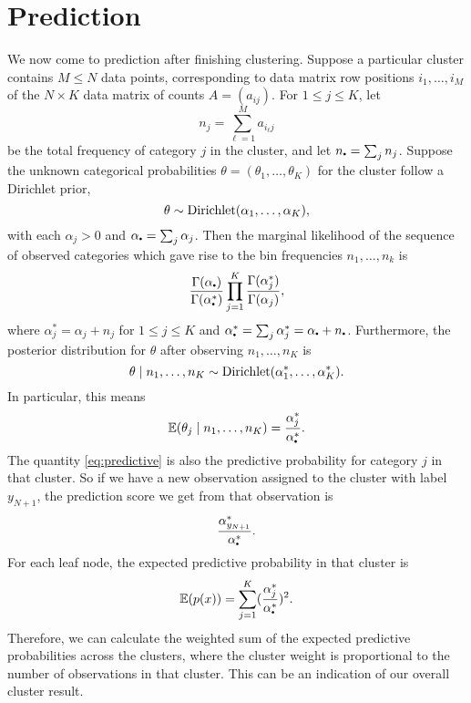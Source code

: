 \section{Prediction}
We now come to prediction after finishing clustering.
Suppose a particular cluster contains $M\leq N$ data points, corresponding to data matrix row positions $i_1,\ldots,i_M$ of the $N\times K$ data matrix of counts $A=(a_{ij})$. For $1\leq j \leq K$, let
\begin{equation}
  n_j = \sum_{\ell=1}^M a_{i_\ell j}
\end{equation}
be the total frequency of category $j$ in the cluster, and let $n_{\mydot} =\sum_j n_j$. Suppose the unknown categorical probabilities $\theta=(\theta_1,\ldots,\theta_K)$ for the cluster follow a Dirichlet prior,
\begin{equation}
  \theta\sim \textnormal{Dirichlet}(\alpha_1,\ldots,\alpha_K),
\end{equation}
with each $\alpha_j>0$ and $\alpha_{\mydot} = \sum_j \alpha_j$.
Then the marginal likelihood of the sequence of observed categories which gave rise to the bin frequencies $n_1,\ldots,n_k$ is
\begin{equation}
  \frac{\Gamma(\alpha_{\mydot})}{\Gamma(\alpha^\ast_{\mydot})}\prod_{j=1}^K \frac{\Gamma(\alpha^\ast_j)}{\Gamma(\alpha_j)},
\end{equation}
where $\alpha^\ast_j=\alpha_j + n_j$ for $1\leq j \leq K$ and $\alpha^\ast_{\mydot}=\sum_j \alpha^\ast_j=\alpha_{\mydot}+n_{\mydot}$.
Furthermore, the posterior distribution for $\theta$ after observing $n_1,\ldots,n_K$ is
\begin{equation}
  \theta\mid n_1,\ldots,n_K \sim \textnormal{Dirichlet}(\alpha^\ast_1,\ldots,\alpha^\ast_K).
\end{equation}
In particular, this means
\begin{equation}
  \mathbb{E} (\theta_j \mid n_1,\ldots,n_K) = \frac{\alpha^\ast_j}{\alpha^\ast_{\mydot}}.\label{eq:predictive}
\end{equation}
The quantity \eqref{eq:predictive} is also the predictive probability for category $j$ in that cluster. So if we have a new observation assigned to the cluster with label $y_{N+1}$, the prediction score we get from that observation is
\begin{equation}
  \frac{\alpha^\ast_{y_{N+1}}}{\alpha^\ast_{\mydot}}.
\end{equation}
For each leaf node, the expected predictive probability in that cluster is
\begin{equation}
    \mathbb{E} (p(x)) = \sum_{j=1}^K (\frac{\alpha^\ast_j}{\alpha^\ast_{\mydot}})^2.
\end{equation}
Therefore, we can calculate the weighted sum of the expected predictive probabilities across the clusters,
where the cluster weight is proportional to the number of observations in that cluster.
This can be an indication of our overall cluster result.

